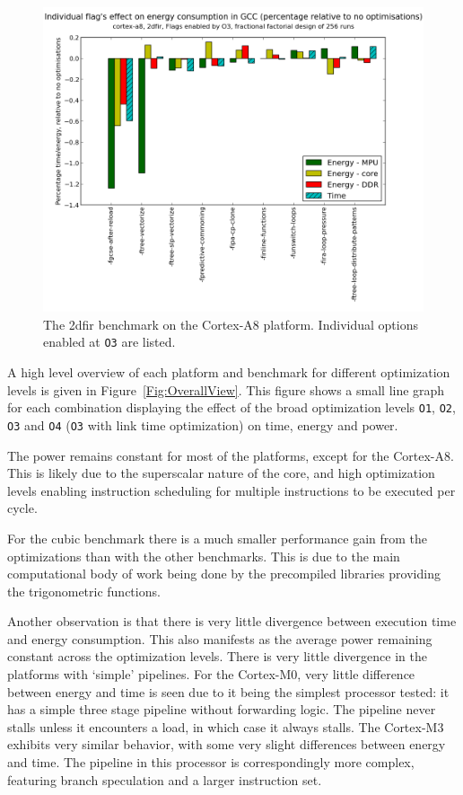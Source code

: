 \documentclass[twocolumn]{article}
\begin{document}
\begin{figure}[t]
	\includegraphics[width=\linewidth]{cortex-a8/O3_main_effects_2dfir.png}
	\caption{The 2dfir benchmark on the Cortex-A8 platform. Individual options enabled at \texttt{O3} are listed.}
	\label{Fig:O3_2dfir_A8}
\end{figure}

A high level overview of each platform and benchmark for different optimization levels is given in Figure~\ref{Fig:OverallView}. This figure shows a small line graph for each combination displaying the effect of the broad optimization levels \texttt{O1}, \texttt{O2}, \texttt{O3} and \texttt{O4} (\texttt{O3} with link time optimization) on time, energy and power.

The power remains constant for most of the platforms, except for the Cortex-A8. This is likely due to the superscalar nature of the core, and high optimization levels enabling instruction scheduling for multiple instructions to be executed per cycle.

For the cubic benchmark there is a much smaller performance gain from the optimizations than with the other benchmarks. This is due to the main computational body of work being done by the precompiled libraries providing the trigonometric functions.

Another observation is that there is very little divergence between execution time and energy consumption. This also manifests as the average power remaining constant across the optimization levels. There is very little divergence in the platforms with `simple' pipelines. For the Cortex-M0, very little difference between energy and time is seen due to it being the simplest processor tested: it has a simple three stage pipeline without forwarding logic. The pipeline never stalls unless it encounters a load, in which case it always stalls. The Cortex-M3 exhibits very similar behavior, with some very slight differences between energy and time. The pipeline in this processor is correspondingly more complex, featuring branch speculation and a larger instruction set.
\end{document}
